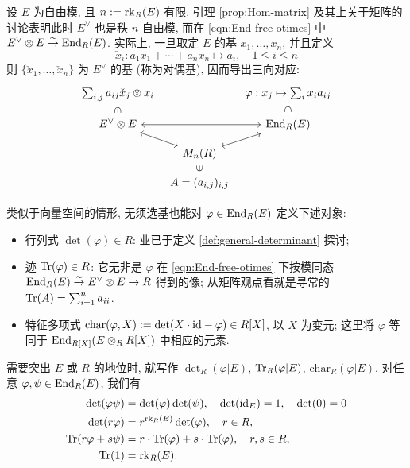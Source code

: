 设 $E$ 为自由模, 且 $n := \operatorname{rk}_R(E)$ 有限. 引理 \ref{prop:Hom-matrix} 及其上关于矩阵的讨论表明此时 $E^\vee$ 也是秩 $n$ 自由模, 而在 \eqref{eqn:End-free-otimes} 中 $E^\vee \otimes E \stackrel{\sim}{\rightarrow} \operatorname{End}_R(E)$. 实际上, 一旦取定 $E$ 的基 $x_1, \ldots, x_n$, 并且定义
\[ \check{x}_i: a_1 x_1 + \cdots + a_n x_n \longmapsto a_i, \quad 1 \leq i \leq n \]
则 $\{\check{x}_1, \ldots, \check{x}_n\}$ 为 $E^\vee$ 的基 (称为对偶基), 因而导出三向对应:
\[\begin{tikzcd}[row sep=small, column sep=tiny]
	\sum_{i,j} a_{ij} \check{x}_j \otimes x_i \arrow[phantom, d, sloped, "\in" description] & & \varphi: x_j \mapsto \sum_i x_i a_{ij} \arrow[phantom, d, sloped, "\in" description] \\
	E^\vee \otimes E \arrow[leftrightarrow, rr]  & & \End_R(E) \\
	& M_n(R) \arrow[leftrightarrow,lu] \arrow[leftrightarrow, ru] & \\
	& A = (a_{i,j})_{i,j} \arrow[phantom, u, sloped, "\in" description] &
\end{tikzcd} \]

类似于向量空间的情形, 无须选基也能对 $\varphi \in \operatorname{End}_R(E)$ 定义下述对象:
\begin{itemize}
	\item 行列式 $\det(\varphi) \in R$: 业已于定义 \ref{def:general-determinant} 探讨;
	\item 迹 $\operatorname{Tr}(\varphi) \in R$: 它无非是 $\varphi$ 在 \eqref{eqn:End-free-otimes} 下按模同态 $\operatorname{End}_R(E) \stackrel{\sim}{\rightarrow} E^\vee \otimes E \to R$ 得到的像; 从矩阵观点看就是寻常的 $\operatorname{Tr}(A) = \sum_{i=1}^n a_{ii}$. 
	\item 特征多项式 $\mathrm{char}(\varphi, X) := \det(X \cdot \mathrm{id} - \varphi) \in R[X]$, 以 $X$ 为变元; 这里将 $\varphi$ 等同于 $\operatorname{End}_{R[X]}(E \otimes_R R[X])$ 中相应的元素.
\end{itemize}
需要突出 $E$ 或 $R$ 的地位时, 就写作 $\det_R(\varphi|E)$, $\operatorname{Tr}_R(\varphi|E)$, $\mathrm{char}_R(\varphi|E)$. 对任意 $\varphi, \psi \in \operatorname{End}_R(E)$, 我们有
\begin{align*}
	\det(\varphi\psi) & = \det(\varphi)\det(\psi), \quad \det(\mathrm{id}_E)=1, \quad \det(0)=0 \\
	\det(r\varphi) &= r^{\operatorname{rk}_R(E)} \det(\varphi), \quad r \in R, \\
	\operatorname{Tr}(r\varphi + s\psi) & = r\cdot\operatorname{Tr}(\varphi) + s\cdot\operatorname{Tr}(\varphi), \quad r,s \in R, \\
	\operatorname{Tr}(1) & = \operatorname{rk}_R(E). 
\end{align*}


